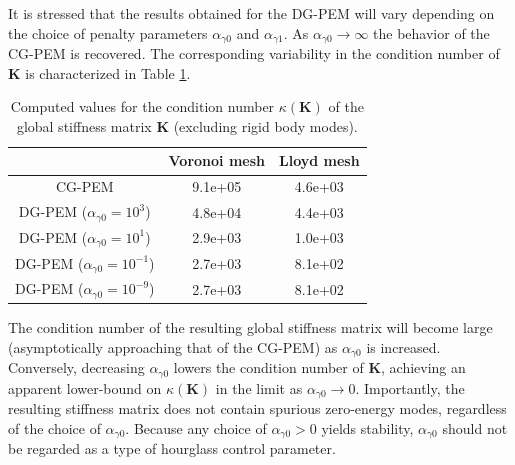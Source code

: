 It is stressed that the results obtained for the DG-PEM will vary depending on the choice of penalty parameters $\alpha_{\gamma0}$ and $\alpha_{\gamma1}$. As $\alpha_{\gamma0} \rightarrow \infty$ the behavior of the CG-PEM is recovered. The corresponding variability in the condition number of $\mathbf{K}$ is characterized in Table \ref{tab:global_stiffness_condition_number}.
\begin{table}[!ht]
  \begin{center}
    \begin{tabular}{| c || c | c |}
    \hline
           & Voronoi mesh & Lloyd mesh \\ \hline \hline
    CG-PEM & 9.1e+05 & 4.6e+03 \\ \hline
    DG-PEM ($\alpha_{\gamma0} = 10^3$) & 4.8e+04 & 4.4e+03 \\ \hline
    DG-PEM ($\alpha_{\gamma0} = 10^1$) & 2.9e+03 & 1.0e+03 \\ \hline
    DG-PEM ($\alpha_{\gamma0} = 10^{-1}$) & 2.7e+03 & 8.1e+02  \\ \hline
    DG-PEM ($\alpha_{\gamma0} = 10^{-9}$) & 2.7e+03 & 8.1e+02 \\
    \hline
    \end{tabular}
    \caption{Computed values for the condition number $\kappa(\mathbf{K})$ of the global stiffness matrix $\mathbf{K}$ (excluding rigid body modes).}
    \vspace{-5pt}
    \label{tab:global_stiffness_condition_number}
    \vspace{-10pt}
  \end{center}
\end{table}

The condition number of the resulting global stiffness matrix will become large (asymptotically approaching that of the CG-PEM) as $\alpha_{\gamma0}$ is increased. Conversely, decreasing $\alpha_{\gamma0}$ lowers the condition number of $\mathbf{K}$, achieving an apparent lower-bound on $\kappa (\mathbf{K})$ in the limit as $\alpha_{\gamma0} \rightarrow 0$. Importantly, the resulting stiffness matrix does not contain spurious zero-energy modes, regardless of the choice of $\alpha_{\gamma0}$. Because any choice of $\alpha_{\gamma0} > 0$ yields stability, $\alpha_{\gamma0}$ should not be regarded as a type of hourglass control parameter.



